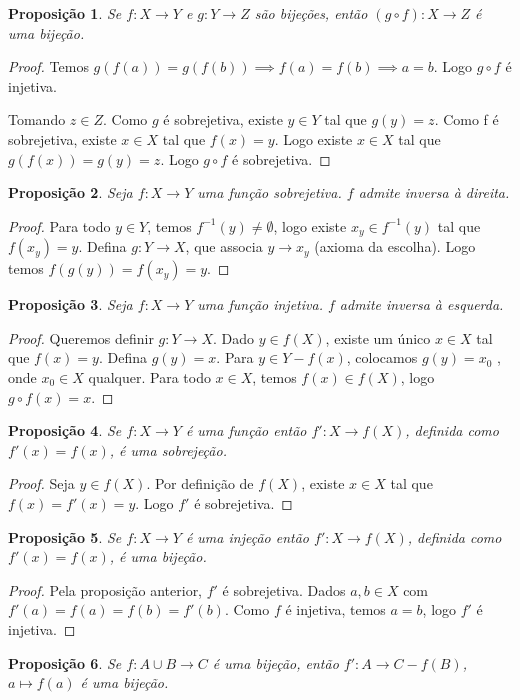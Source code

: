 \documentclass{article}
\newtheorem{prop}{Proposição}[section]
\theoremstyle{theorem}
\theoremstyle{lemma}
\theoremstyle{definition}
\theoremstyle{remark}
\begin{document}
\begin{prop}
	Se $f:X\to Y$ e $g:Y\to Z$ são bijeções, então $(g \circ f): X\to Z$ é uma bijeção.
\end{prop}
\begin{proof}
	Temos $g(f(a)) = g(f(b)) \implies f(a) = f(b) \implies a = b$. Logo $g \circ f$ é injetiva.

	Tomando $z \in Z$. Como $g$ é sobrejetiva, existe $y\in Y$ tal que $g(y) = z$. Como f é sobrejetiva, existe $x\in X$ tal que $f(x) = y$. Logo existe $x\in X$ tal que  $g(f(x)) = g(y) = z$. Logo $g\circ f$ é sobrejetiva.
\end{proof}
\begin{prop}
	Seja $f:X \to Y$ uma função sobrejetiva. $f$ admite inversa à direita.
\end{prop}
\begin{proof}
	Para todo $y\in Y$, temos $f^{-1}(y) \neq \emptyset$, logo existe $x_y \in f^{-1}(y)$ tal que $f(x_y) = y$. Defina $g: Y\to X$, que associa $y\to x_y$ (axioma da escolha). Logo temos $f(g(y)) = f(x_y) = y$.
\end{proof}
\begin{prop}
	Seja $f:X \to Y$ uma função injetiva. $f$ admite inversa à esquerda.
\end{prop}
\begin{proof}
	Queremos definir $g: Y \to X$. Dado $y \in f(X)$, existe um único $x \in X$ tal que $f(x) = y$. Defina $g(y) = x$. Para $y\in Y - f(x)$, colocamos $g(y) = x_0$ , onde $x_0 \in X$ qualquer. Para todo $x\in X$, temos $f(x) \in f(X)$, logo $g\circ f (x) = x$. 
\end{proof}
\begin{prop}
	Se $f:X\to Y$ é uma função  então $f': X\to f(X)$, definida como $f'(x) = f(x)$, é uma sobrejeção.
\end{prop}
\begin{proof}
	Seja $y\in f(X)$. Por definição de $f(X)$, existe $x\in X$ tal que $f(x) = f'(x) =  y$. Logo $f'$ é sobrejetiva.
\end{proof}
\begin{prop}
	Se $f:X\to Y$ é uma injeção então $f': X\to f(X)$, definida como $f'(x) = f(x)$, é uma bijeção.
\end{prop}
\begin{proof}
	Pela proposição anterior, $f'$ é sobrejetiva.
	Dados $a,b\in X$ com $f'(a)  = f(a) = f(b) =  f'(b)$. Como $f$ é injetiva, temos $a = b$, logo $f'$ é injetiva.
\end{proof}
\begin{prop}
	\label{propbijecao}
	Se $f: A\cup B \to C$ é uma bijeção, então $f': A \to C-f(B)$, $a\mapsto f(a)$ é uma bijeção.
\end{prop}
\end{document}
